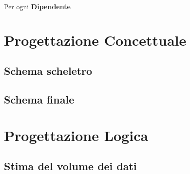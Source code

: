 \documentclass[a4paper, 12pt]{report}
\newenvironment{changemargin}[2]{%
  \begin{list}{}{%
    \setlength{\topsep}{0pt}%
    \setlength{\leftmargin}{#1}%
    \setlength{\rightmargin}{#2}%
    \setlength{\listparindent}{\parindent}%
    \setlength{\itemindent}{\parindent}%
    \setlength{\parsep}{\parskip}%
  }%
  \item[]}{\end{list}}
\begin{document}
\begin{changemargin}{0.5cm}{0.5cm}
        Per ogni \textbf{Dipendente} 
\end{changemargin}

\chapter{Progettazione Concettuale}

\section{Schema scheletro}

\section{Schema finale}

\chapter{Progettazione Logica}

\section{Stima del volume dei dati}
\end{document}

